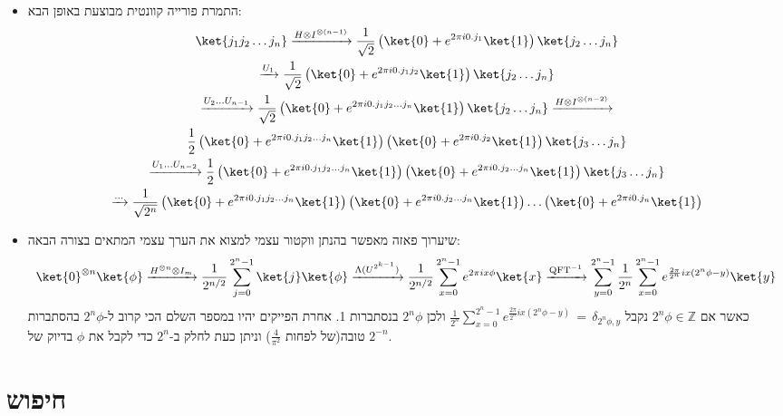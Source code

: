 \documentclass{tstextbook}
\begin{document}
\begin{summary}
  \begin{itemize}
    \item התמרת פורייה קוונטית מבוצעת באופן הבא:
\begin{gather*}\ket{j_1 j_2 \dots j_n} \xrightarrow{H \otimes I^{\otimes (n-1)}} \frac{1}{\sqrt{2}} \left( \ket{0} + e^{2\pi i 0.j_1} \ket{1} \right) \ket{j_2 \dots j_n}  \\\xrightarrow{U_1} \frac{1}{\sqrt{2}} \left( \ket{0} + e^{2\pi i 0.j_1 j_2} \ket{1} \right) \ket{j_2 \dots j_n}  \\\xrightarrow{U_2 \dots U_{n-1}} \frac{1}{\sqrt{2}} \left( \ket{0} + e^{2\pi i 0.j_1 j_2 \dots j_n} \ket{1} \right) \ket{j_2 \dots j_n}\xrightarrow{H \otimes I^{\otimes (n-2)}}  \\\frac{1}{2} \left( \ket{0} + e^{2\pi i 0.j_1 j_2 \dots j_n} \ket{1} \right) \left( \ket{0} + e^{2\pi i 0.j_2} \ket{1} \right) \ket{j_3 \dots j_n}  \\\xrightarrow{U_1 \dots U_{n-2}} \frac{1}{2} \left( \ket{0} + e^{2\pi i 0.j_1 j_2 \dots j_n} \ket{1} \right) \left( \ket{0} + e^{2\pi i 0.j_2 \dots j_n} \ket{1} \right) \ket{j_3 \dots j_n} \\\xrightarrow{\dots}  \frac{1}{\sqrt{2^n}} \left( \ket{0} + e^{2\pi i 0.j_1 j_2 \dots j_n} \ket{1} \right) \left( \ket{0} + e^{2\pi i 0.j_2 \dots j_n} \ket{1} \right) \dots \left( \ket{0} + e^{2\pi i 0.j_n} \ket{1} \right)
\end{gather*}
    \item שיערוך פאזה מאפשר בהנתן ווקטור עצמי למצוא את הערך עצמי המתאים בצורה הבאה:
\begin{gather*}\ket{0}^{\otimes n} \ket{\phi} \xrightarrow{H^{\otimes n} \otimes I_m} \frac{1}{2^{n/2}} \sum_{j=0}^{2^n-1} \ket{j} \ket{\phi} \xrightarrow{\Lambda(U^{2^{k-1}})} \frac{1}{2^{n/2}} \sum_{x=0}^{2^n-1} e^{2\pi i x\phi} \ket{x} \xrightarrow{\text{QFT}^{-1}} \sum_{y=0}^{2^n-1} \frac{1}{2^n} \sum_{x=0}^{2^n-1} e^{\frac{2\pi}{2^n} i x (2^n \phi - y)} \ket{y}
\end{gather*}
כאשר אם \(2^{n}\phi \in \mathbb{Z}\) נקבל \(\frac{1}{2^{n}}\sum_{x=0}^{2^{n}-1}e^{\frac{2\pi}{2^{n}}i x(2^{n}\phi-y)}\,=\,\delta_{2^{n}\phi,y}\) ולכן \(2^{n}\phi\) בנסתברות 1. אחרת הפייקים יהיו במספר השלם הכי קרוב ל-\(2^{n}\phi\) בהסתברות טובה(של לפחות \(\frac{4}{\pi^{2}}\)) וניתן כעת לחלק ב-\(2^{n}\) כדי לקבל את \(\phi\) בדיוק של \(2^{-n}\).
  \end{itemize}
\end{summary}
\section{חיפוש}
\end{document}
